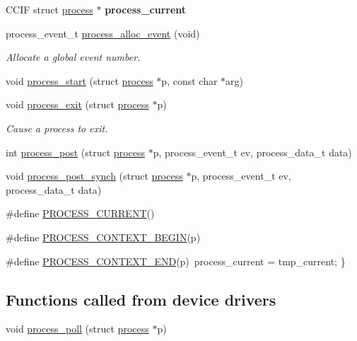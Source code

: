 \begin{DoxyCompactItemize}
\item 
\hypertarget{group__process_ga5d5ebe8593273fc5cb6d4a203879b300}{C\-C\-I\-F struct \hyperlink{structprocess}{process} $\ast$ {\bfseries process\-\_\-current}}\label{group__process_ga5d5ebe8593273fc5cb6d4a203879b300}

\item 
process\-\_\-event\-\_\-t \hyperlink{group__process_ga24326129d48a7afaf618e3e01f75c086}{process\-\_\-alloc\-\_\-event} (void)
\begin{DoxyCompactList}\small\item\em Allocate a global event number. \end{DoxyCompactList}\item 
void \hyperlink{group__process_ga1ecfc797b48072142b3e22ac1f0bbfdd}{process\-\_\-start} (struct \hyperlink{structprocess}{process} $\ast$p, const char $\ast$arg)
\item 
void \hyperlink{group__process_ga7f3c7706ec62fbcbdf018f799b21cd66}{process\-\_\-exit} (struct \hyperlink{structprocess}{process} $\ast$p)
\begin{DoxyCompactList}\small\item\em Cause a process to exit. \end{DoxyCompactList}\item 
int \hyperlink{group__process_gaaf5f03bb404a67415ea4ea72a749203f}{process\-\_\-post} (struct \hyperlink{structprocess}{process} $\ast$p, process\-\_\-event\-\_\-t ev, process\-\_\-data\-\_\-t data)
\item 
void \hyperlink{group__process_ga6b8e9574ecf58706d51b28c26723a94b}{process\-\_\-post\-\_\-synch} (struct \hyperlink{structprocess}{process} $\ast$p, process\-\_\-event\-\_\-t ev, process\-\_\-data\-\_\-t data)
\item 
\#define \hyperlink{group__process_ga64e81621381e2e575fad8959ce7a8496}{P\-R\-O\-C\-E\-S\-S\-\_\-\-C\-U\-R\-R\-E\-N\-T}()
\item 
\#define \hyperlink{group__process_gaa355c55e3ff7aa0999f2ae770298b7bb}{P\-R\-O\-C\-E\-S\-S\-\_\-\-C\-O\-N\-T\-E\-X\-T\-\_\-\-B\-E\-G\-I\-N}(p)
\item 
\#define \hyperlink{group__process_gae4aa7fc8384dfc5416669cc0f712d0ed}{P\-R\-O\-C\-E\-S\-S\-\_\-\-C\-O\-N\-T\-E\-X\-T\-\_\-\-E\-N\-D}(p)~process\-\_\-current = tmp\-\_\-current; \}
\end{DoxyCompactItemize}
\subsection*{Functions called from device drivers}
\begin{DoxyCompactItemize}
\item 
void \hyperlink{group__process_ga496ba132ce7a2ec12a8313dc05ab0142}{process\-\_\-poll} (struct \hyperlink{structprocess}{process} $\ast$p)
\end{DoxyCompactItemize}
